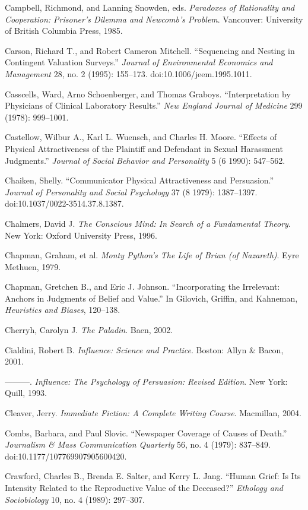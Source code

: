 \documentclass[letterpaper]{book}
\begin{document}
{
 Campbell, Richmond, and Lanning Snowden, eds. \textit{Paradoxes of
Rationality and Cooperation: Prisoner's Dilemma and
Newcomb's Problem}. Vancouver: University of British
Columbia Press, 1985.}

{
 Carson, Richard T., and Robert Cameron Mitchell.
``Sequencing and Nesting in Contingent Valuation
Surveys.'' \textit{Journal of Environmental Economics
and Management} 28, no. 2 (1995): 155--173.
doi:10.1006/jeem.1995.1011.}

{
 Casscells, Ward, Arno Schoenberger, and Thomas Graboys.
``Interpretation by Physicians of Clinical Laboratory
Results.'' \textit{New England Journal of Medicine}
299 (1978): 999--1001.}

{
 Castellow, Wilbur A., Karl L. Wuensch, and Charles H. Moore.
``Effects of Physical Attractiveness of the Plaintiff
and Defendant in Sexual Harassment Judgments.''
\textit{Journal of Social Behavior and Personality} 5 (6 1990):
547--562.}

{
 Chaiken, Shelly. ``Communicator Physical
Attractiveness and Persuasion.'' \textit{Journal of
Personality and Social Psychology} 37 (8 1979): 1387--1397.
doi:10.1037/0022-3514.37.8.1387.}

{
 Chalmers, David J. \textit{The Conscious Mind: In Search of a
Fundamental Theory}. New York: Oxford University Press, 1996.}

{
 Chapman, Graham, et al. \textit{Monty Python's The
Life of Brian (of Nazareth)}. Eyre Methuen, 1979.}

{
 Chapman, Gretchen B., and Eric J. Johnson.
``Incorporating the Irrelevant: Anchors in Judgments
of Belief and Value.'' In Gilovich, Griffin, and
Kahneman, \textit{Heuristics and Biases}, 120--138.}

{
 Cherryh, Carolyn J. \textit{The Paladin}. Baen, 2002.}

{
 Cialdini, Robert B. \textit{Influence: Science and Practice}.
Boston: Allyn \& Bacon, 2001.}

{
 {}---{}---{}---. \textit{Influence: The Psychology of Persuasion:
Revised Edition}. New York: Quill, 1993.}

{
 Cleaver, Jerry. \textit{Immediate Fiction: A Complete Writing
Course}. Macmillan, 2004.}

{
 Combs, Barbara, and Paul Slovic. ``Newspaper
Coverage of Causes of Death.'' \textit{Journalism \&
Mass Communication Quarterly} 56, no. 4 (1979): 837--849.
doi:10.1177/107769907905600420.}

{
 Crawford, Charles B., Brenda E. Salter, and Kerry L. Jang.
``Human Grief: Is Its Intensity Related to the
Reproductive Value of the Deceased?''
\textit{Ethology and Sociobiology} 10, no. 4 (1989): 297--307.}
\end{document}
